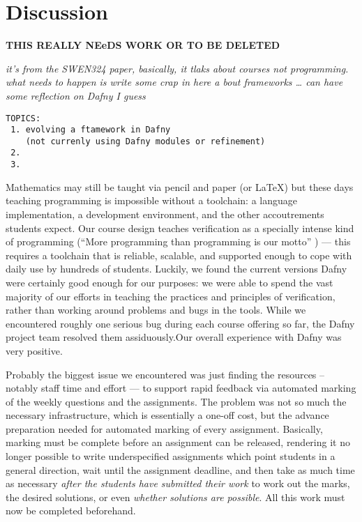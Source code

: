 \section{Discussion}


\textbf{THIS REALLY NEeDS WORK OR TO BE DELETED}

\emph{
it's from the SWEN324 paper, basically, it tlaks about courses not programming.
%
what needs to happen is write some crap in here a bout frameworks \ldots
%
can have some reflection on Dafny I guess
%
}
\begin{verbatim}
TOPICS:
 1. evolving a ftamework in Dafny
    (not currenly using Dafny modules or refinement)
 2. 
 3. 
\end{verbatim}



Mathematics may still be taught via pencil and paper (or \LaTeX) but
these days teaching programming is impossible without a toolchain: a
language implementation, a development environment, and the other
accoutrements students expect.  Our course design teaches verification
as a specially intense kind of programming (``More programming than
programming is our motto'' \cite{bladeRunnerFilm}) --- this requires
a toolchain that is reliable, scalable, and supported enough to cope
with daily use by hundreds of students.
%
Luckily, we found the current versions Dafny were certainly good
enough for our purposes: we were able to spend the vast majority of
our efforts in teaching the practices and principles of verification,
rather than working around problems and bugs in the tools. While we
encountered roughly one serious bug during each course offering so
far, the Dafny project team resolved them assiduously.Our overall
experience with Dafny was very positive. 

Probably the biggest issue we
encountered was just finding the resources -- notably staff time and
effort --- to support rapid feedback via automated marking of the
weekly questions and the assignments. The problem was not so much the
necessary infrastructure, which is essentially a one-off cost, but the
advance preparation needed for automated marking of every assignment.
Basically, marking must be complete before an assignment can be
released, rendering it no longer possible to write underspecified assignments
which point students in a general direction, wait until the assignment deadline, and then take as much
time as necessary \textit{after the students have submitted their work}
to work out the marks, the desired solutions, or
even \textit{whether solutions are possible}. All this work must now be completed beforehand.

